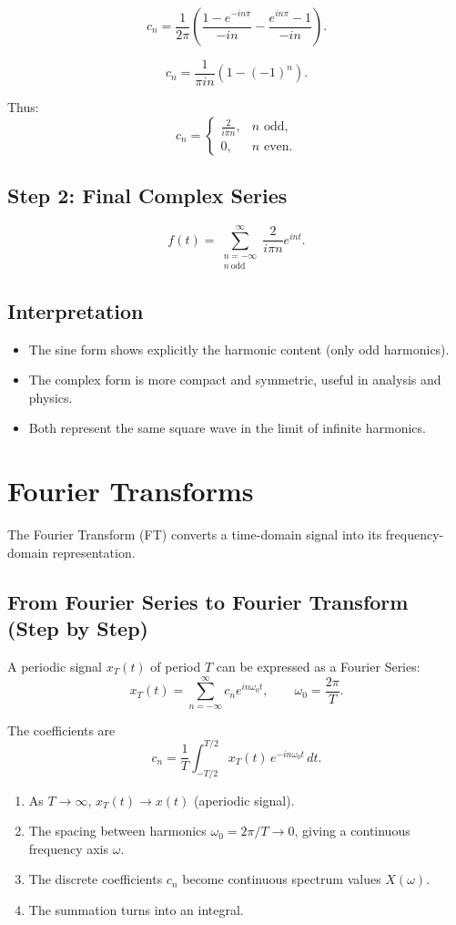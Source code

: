 \documentclass[a4paper,12pt]{article}
\begin{document}
\[
c_n = \frac{1}{2\pi}\left(\frac{1-e^{-in\pi}}{-in} - \frac{e^{in\pi}-1}{-in}\right).
\]

\[
c_n = \frac{1}{\pi in}(1-(-1)^n).
\]

Thus:
\[
c_n =
\begin{cases}
\frac{2}{i\pi n}, & n \text{ odd}, \\
0, & n \text{ even}.
\end{cases}
\]

\subsection{Step 2: Final Complex Series}
\[
f(t) = \sum_{\substack{n=-\infty \\ n\ \text{odd}}}^{\infty} \frac{2}{i\pi n} e^{int}.
\]

\subsection{Interpretation}
\begin{itemize}
    \item The sine form shows explicitly the harmonic content (only odd harmonics).
    \item The complex form is more compact and symmetric, useful in analysis and physics.
    \item Both represent the same square wave in the limit of infinite harmonics.
\end{itemize}

\section{\Huge\textbf{Fourier Transforms}}
The Fourier Transform (FT) converts a time-domain signal into its frequency-domain representation.

\subsection{From Fourier Series to Fourier Transform (Step by Step)}

A periodic signal $x_T(t)$ of period $T$ can be expressed as a Fourier Series:
\[
x_T(t) = \sum_{n=-\infty}^{\infty} c_n e^{i n \omega_0 t}, 
\qquad \omega_0 = \frac{2\pi}{T}.
\]

The coefficients are
\[
c_n = \frac{1}{T} \int_{-T/2}^{T/2} x_T(t)\, e^{-i n \omega_0 t}\,dt.
\]

\begin{enumerate}
    \item As $T \to \infty$, $x_T(t) \to x(t)$ (aperiodic signal).
    \item The spacing between harmonics $\omega_0 = 2\pi/T \to 0$, giving a continuous frequency axis $\omega$.
    \item The discrete coefficients $c_n$ become continuous spectrum values $X(\omega)$.
    \item The summation turns into an integral.
\end{enumerate}
\end{document}

